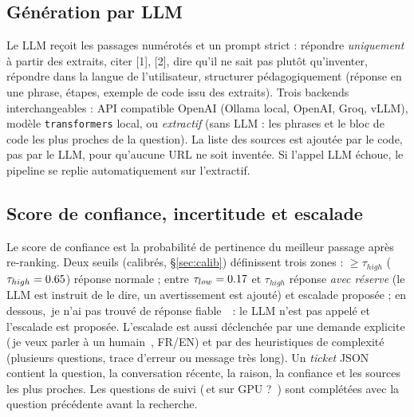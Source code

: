 \documentclass[11pt,a4paper]{article}
\providecommand{\og}{\guillemotleft\,}\providecommand{\fg}{\,\guillemotright}
\newcommand{\code}[1]{\texttt{\small #1}}
\begin{document}
\subsection{G\'en\'eration par LLM}
Le LLM re\c coit les passages num\'erot\'es et un prompt strict : r\'epondre \emph{uniquement} \`a partir des extraits, citer [1], [2], dire qu'il ne sait pas plut\^ot qu'inventer, r\'epondre dans la langue de l'utilisateur, structurer p\'edagogiquement (r\'eponse en une phrase, \'etapes, exemple de code issu des extraits). Trois backends interchangeables : API compatible OpenAI (Ollama local, OpenAI, Groq, vLLM), mod\`ele \code{transformers} local, ou \emph{extractif} (sans LLM : les phrases et le bloc de code les plus proches de la question). La liste des sources est ajout\'ee par le code, pas par le LLM, pour qu'aucune URL ne soit invent\'ee. Si l'appel LLM \'echoue, le pipeline se replie automatiquement sur l'extractif.

\subsection{Score de confiance, incertitude et escalade}
Le score de confiance est la probabilit\'e de pertinence du meilleur passage apr\`es re-ranking. Deux seuils (calibr\'es, \S\ref{sec:calib}) d\'efinissent trois zones : $\geq\tau_{high}$ ($\tau_{high}=0.65$) r\'eponse normale ; entre $\tau_{low}=0.17$ et $\tau_{high}$ r\'eponse \emph{avec r\'eserve} (le LLM est instruit de le dire, un avertissement est ajout\'e) et escalade propos\'ee ; en dessous, \og je n'ai pas trouv\'e de r\'eponse fiable \fg\ : le LLM n'est pas appel\'e et l'escalade est propos\'ee. L'escalade est aussi d\'eclench\'ee par une demande explicite (\og je veux parler \`a un humain \fg, FR/EN) et par des heuristiques de complexit\'e (plusieurs questions, trace d'erreur ou message tr\`es long). Un \emph{ticket} JSON contient la question, la conversation r\'ecente, la raison, la confiance et les sources les plus proches. Les questions de suivi (\og et sur GPU ? \fg) sont compl\'et\'ees avec la question pr\'ec\'edente avant la recherche.
\end{document}
